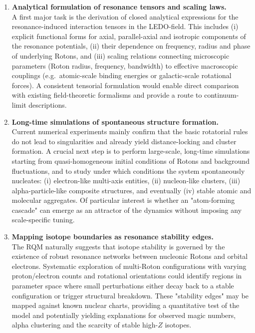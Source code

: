 \documentclass[11pt,a4paper]{article}
\begin{document}
\begin{enumerate}
    \item \textbf{Analytical formulation of resonance tensors and scaling laws.}\\
    A first major task is the derivation of closed analytical expressions for the resonance-induced interaction tensors in the LEDO-field. 
    This includes (i) explicit functional forms for axial, parallel-axial and isotropic components of the resonance potentials, (ii) their dependence on frequency, radius and phase of underlying Rotons, and (iii) scaling relations connecting microscopic parameters (Roton radius, frequency, bandwidth) to effective macroscopic couplings (e.g.\ atomic-scale binding energies or galactic-scale rotational forces). 
    A consistent tensorial formulation would enable direct comparison with existing field-theoretic formalisms and provide a route to continuum-limit descriptions.

    \item \textbf{Long-time simulations of spontaneous structure formation.}\\
    Current numerical experiments mainly confirm that the basic rotatorial rules do not lead to singularities and already yield distance-locking and cluster formation.
    A crucial next step is to perform large-scale, long-time simulations starting from quasi-homogeneous initial conditions of Rotons and background fluctuations, and to study under which conditions the system spontaneously nucleates:
    (i) electron-like multi-axis entities, (ii) nucleon-like clusters, (iii) alpha-particle-like composite structures, and eventually (iv) stable atomic and molecular aggregates.
    Of particular interest is whether an "atom-forming cascade" can emerge as an attractor of the dynamics without imposing any scale-specific tuning.

    \item \textbf{Mapping isotope boundaries as resonance stability edges.}\\
    The RQM naturally suggests that isotope stability is governed by the existence of robust resonance networks between nucleonic Rotons and orbital electrons.
    Systematic exploration of multi-Roton configurations with varying proton/electron counts and rotational orientations could identify regions in parameter space where small perturbations either decay back to a stable configuration or trigger structural breakdown.
    These "stability edges" may be mapped against known nuclear charts, providing a quantitative test of the model and potentially yielding explanations for observed magic numbers, alpha clustering and the scarcity of stable high-$Z$ isotopes.


\end{enumerate}
\end{document}
